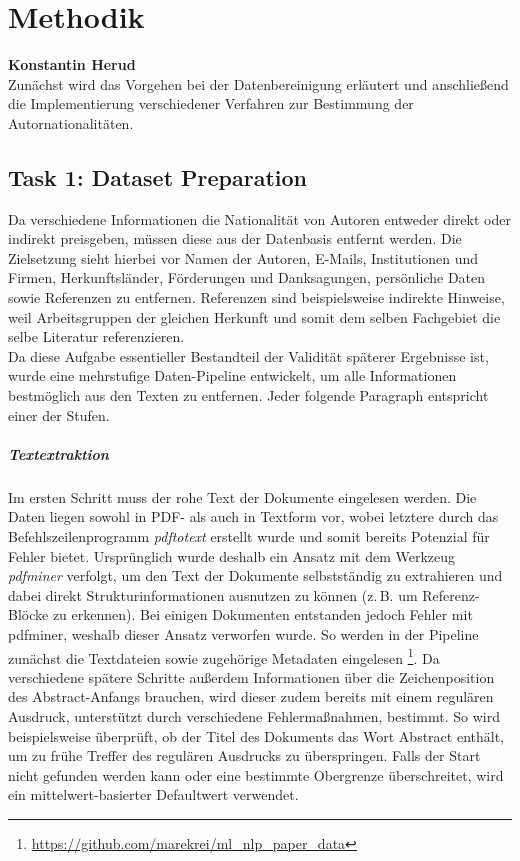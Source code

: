 \documentclass[bachelor,german]{info1thesis}
\begin{document}

\chapter{Methodik}
\textbf{Konstantin Herud} \\
Zunächst wird das Vorgehen bei der Datenbereinigung erläutert und anschließend die Implementierung verschiedener Verfahren zur Bestimmung der Autornationalitäten.

\section{Task 1: Dataset Preparation}

Da verschiedene Informationen die Nationalität von Autoren entweder direkt oder indirekt preisgeben, müssen diese aus der Datenbasis entfernt werden. Die Zielsetzung sieht hierbei vor
Namen der Autoren,
E-Mails,
Institutionen und Firmen,
Herkunftsländer,
Förderungen und Danksagungen,
persönliche Daten
sowie Referenzen
zu entfernen.
Referenzen sind beispielsweise indirekte Hinweise, weil Arbeitsgruppen der gleichen Herkunft und somit dem selben Fachgebiet die selbe Literatur referenzieren. \\
Da diese Aufgabe essentieller Bestandteil der Validität späterer Ergebnisse ist, wurde eine mehrstufige Daten-Pipeline entwickelt, um alle Informationen bestmöglich aus den Texten zu entfernen. Jeder folgende Paragraph entspricht einer der Stufen.

\paragraph{Textextraktion} Im ersten Schritt muss der rohe Text der Dokumente eingelesen werden. Die Daten liegen sowohl in PDF- als auch in Textform vor, wobei letztere durch das Befehlszeilenprogramm \textit{pdftotext} erstellt wurde und somit bereits Potenzial für Fehler bietet. Ursprünglich wurde deshalb ein Ansatz mit dem Werkzeug \textit{pdfminer} verfolgt, um den Text der Dokumente selbstständig zu extrahieren und dabei direkt Strukturinformationen ausnutzen zu können (z.\,B. um Referenz-Blöcke zu erkennen). Bei einigen Dokumenten entstanden jedoch Fehler mit pdfminer, weshalb dieser Ansatz verworfen wurde. So werden in der Pipeline zunächst die Textdateien sowie zugehörige Metadaten eingelesen \footnote{\url{https://github.com/marekrei/ml_nlp_paper_data}}. Da verschiedene spätere Schritte außerdem Informationen über die Zeichenposition des Abstract-Anfangs brauchen, wird dieser zudem bereits mit einem regulären Ausdruck, unterstützt durch verschiedene Fehlermaßnahmen, bestimmt. So wird beispielsweise überprüft, ob der Titel des Dokuments das Wort Abstract enthält, um zu frühe Treffer des regulären Ausdrucks zu überspringen. Falls der Start nicht gefunden werden kann oder eine bestimmte Obergrenze überschreitet, wird ein mittelwert-basierter Defaultwert verwendet.
\end{document}
